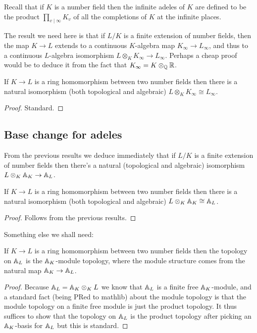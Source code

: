 Recall that if $K$ is a number field then the infinite adeles of $K$ are defined
to be the product $\prod_{v\mid\infty} K_v$ of all the completions of $K$ at the
infinite places.

The result we need here is that if $L/K$ is a finite extension of number fields,
then the map $K\to L$ extends to a continuous $K$-algebra map $K_\infty\to L_\infty$,
and thus to a continuous $L$-algebra isomorphism $L\otimes_KK_\infty\to L_\infty$.
Perhaps a cheap proof would be to deduce it from the fact that $K_\infty=K\otimes_{\mathbb{Q}}\mathbb{R}$.

\begin{theorem}
  \label{NumberField.InfiniteAdeleRing.baseChangeEquiv}
  If $K\to L$ is a ring homomorphism between two number fields then there is a natural isomorphism
  (both topological and algebraic) $L\otimes_KK_\infty\cong L_\infty$.
\end{theorem}
\begin{proof}
  Standard.
\end{proof}

\subsection{Base change for adeles}

From the previous results we deduce immediately that if $L/K$ is a finite extension
of number fields then there's a natural (topological and algebraic) isomorphism
$L\otimes_K\mathbb{A}_K\to \mathbb{A}_L$.

\begin{theorem}
  \label{NumberField.AdeleRing.baseChangeEquiv}
  If $K\to L$ is a ring homomorphism between two number fields then there is a natural isomorphism
  (both topological and algebraic) $L\otimes_K\mathbb{A}_K\cong\mathbb{A}_L$.
\end{theorem}
\begin{proof}
  Follows from the previous results.
\end{proof}

Something else we shall need:

\begin{theorem}
  \label{NumberField.AdeleRing.baseChange_moduleTopology}
  If $K\to L$ is a ring homomorphism between two number fields then the topology on $\mathbb{A}_L$
  is the $\mathbb{A}_K$-module topology, where the module structure comes from the
  natural map $\mathbb{A}_K\to\mathbb{A}_L$.
\end{theorem}
\begin{proof}
  Because $\mathbb{A}_L=\mathbb{A}_K\otimes_{K}L$ we know that $\mathbb{A}_L$ is a finite free $\mathbb{A}_K$-module,
  and a standard fact (being PRed to mathlib) about the module topology is that the module topology
  on a finite free module is just the product topology. It thus suffices to show that
  the topology on $\mathbb{A}_L$ is the product topology after picking an $\mathbb{A}_K$-basis for $\mathbb{A}_L$
  but this is standard.
\end{proof}


